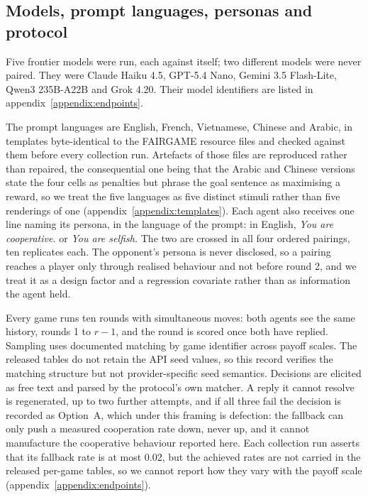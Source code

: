 \documentclass[11pt,a4paper]{article}
\begin{document}
\subsection{Models, prompt languages, personas and protocol}\label{sec:protocol}

Five frontier models were run, each against itself; two different models were
never paired. They were Claude Haiku 4.5, GPT-5.4 Nano, Gemini 3.5 Flash-Lite,
Qwen3 235B-A22B and Grok 4.20. Their model identifiers are listed in
appendix~\ref{appendix:endpoints}.

The prompt languages are English, French, Vietnamese, Chinese and Arabic, in
templates byte-identical to the FAIRGAME resource files and checked against
them before every collection run. Artefacts of those files are reproduced
rather than repaired, the consequential one being that the Arabic and Chinese
versions state the four cells as penalties but phrase the goal sentence as
maximising a reward, so we treat the five languages as five distinct stimuli
rather than five renderings of one (appendix~\ref{appendix:templates}). Each
agent also receives one line naming its persona, in the language of the prompt:
in English, \emph{You are cooperative.} or \emph{You are selfish.} The two are
crossed in all four ordered pairings, ten replicates each. The opponent's
persona is never disclosed, so a pairing reaches a player only through realised
behaviour and not before round 2, and we treat it as a design factor and a
regression covariate rather than as information the agent held.

Every game runs ten rounds with simultaneous moves: both agents see the same
history, rounds 1 to $r-1$, and the round is scored once both have replied.
Sampling uses documented matching by game identifier across payoff scales.
The released tables do not retain the API seed values, so this record verifies
the matching structure but not provider-specific seed semantics. Decisions are elicited
as free text and parsed by the protocol's own matcher. A reply it cannot
resolve is regenerated, up to two further attempts, and if all three fail the
decision is recorded as Option~A, which under this framing is defection: the
fallback can only push a measured cooperation rate down, never up, and it
cannot manufacture the cooperative behaviour reported here. Each collection run
asserts that its fallback rate is at most 0.02, but the achieved rates are not
carried in the released per-game tables, so we cannot report how they vary with
the payoff scale (appendix~\ref{appendix:endpoints}).
\end{document}

